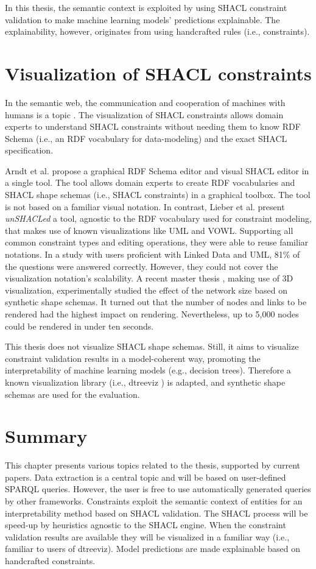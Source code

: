 In this thesis, the semantic context is exploited by using SHACL constraint validation to make machine learning models' predictions explainable. The explainability, however, originates from using handcrafted rules (i.e., constraints).

\section{Visualization of SHACL constraints}
In the semantic web, the communication and cooperation of machines with humans is a topic \cite{berners2002new}. The visualization of SHACL constraints allows domain experts to understand SHACL constraints without needing them to know RDF Schema (i.e., an RDF vocabulary for data-modeling) and the exact SHACL specification. 

Arndt et al. \cite{visualShapesEditor} propose a graphical RDF Schema editor and visual SHACL editor in a single tool. The tool allows domain experts to create RDF vocabularies and SHACL shape schemas (i.e., SHACL constraints) in a graphical toolbox. The tool is not based on a familiar visual notation. In contrast, Lieber et al. \cite{unSHACLed} present \emph{unSHACLed} a tool, agnostic to the RDF vocabulary used for constraint modeling, that makes use of known visualizations like UML and VOWL. Supporting all common constraint types and editing operations, they were able to reuse familiar notations. In a study with users proficient with Linked Data and UML, 81\% of the questions were answered correctly. However, they could not cover the visualization notation's scalability. A recent master thesis \cite{haneyThesis}, making use of 3D visualization, experimentally studied the effect of the network size based on synthetic shape schemas. It turned out that the number of nodes and links to be rendered had the highest impact on rendering. Nevertheless, up to 5,000 nodes could be rendered in under ten seconds.

This thesis does not visualize SHACL shape schemas. Still, it aims to visualize constraint validation results in a model-coherent way, promoting the interpretability of machine learning models (e.g., decision trees). Therefore a known visualization library (i.e., dtreeviz \cite{dtreeviz}) is adapted, and synthetic shape schemas are used for the evaluation.


\section{Summary}
This chapter presents various topics related to the thesis, supported by current papers. Data extraction is a central topic and will be based on user-defined SPARQL queries. However, the user is free to use automatically generated queries by other frameworks. Constraints exploit the semantic context of entities for an interpretability method based on SHACL validation. The SHACL process will be speed-up by heuristics agnostic to the SHACL engine. When the constraint validation results are available they will be visualized in a familiar way (i.e., familiar to users of dtreeviz). Model predictions are made explainable based on handcrafted constraints.